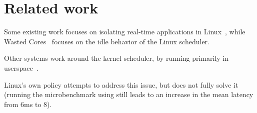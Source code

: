 \section{Related work}

Some existing work focuses on isolating real-time applications in
Linux~\cite{rt-in-linux, state-rt-linux}, while Wasted Cores~\cite{wasted-cores}
focuses on the idle behavior of the Linux scheduler.

Other systems work around the kernel scheduler, by running primarily in
userspace~\cite{perfiso,caladan,skyloft}.

Linux's own \schedidle{} policy attempts to address this issue, but does not
fully solve it (running the microbenchmark using \schedidle{} still leads to an
increase in the mean latency from 6ms to 8).